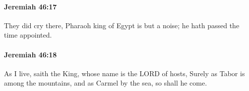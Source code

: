 		\paragraph{Jeremiah 46:17} %
			\label{JEREMIAH-46-17}

			They did cry there, Pharaoh king of Egypt is but a noise; he hath passed the time appointed.


		\paragraph{Jeremiah 46:18} %
			\label{JEREMIAH-46-18}

			As I live, saith the King, whose name is the LORD of hosts, Surely as Tabor is among the mountains, and as Carmel by the sea, so shall he come.


